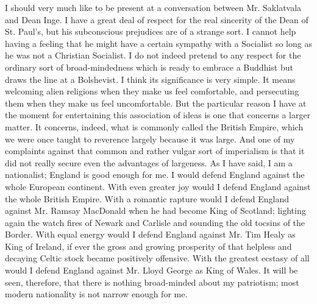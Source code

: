 \documentclass{book}
\begin{document}
I should very much like to be present at a conversation between Mr. Saklatvala and Dean Inge. I have a great deal of respect for the real sincerity of the Dean of St. Paul’s, but his subconscious prejudices are of a strange sort. I cannot help having a feeling that he might have a certain sympathy with a Socialist so long as he was not a Christian Socialist. I do not indeed pretend to any respect for the ordinary sort of broad-mindedness which is ready to embrace a Buddhist but draws the line at a Bolshevist. I think its significance is very simple. It means welcoming alien religions when they make us feel comfortable, and persecuting them when they make us feel uncomfortable. But the particular reason I have at the moment for entertaining this association of ideas is one that concerns a larger matter. It concerns, indeed, what is commonly called the British Empire, which we were once taught to reverence largely because it was large. And one of my complaints against that common and rather vulgar sort of imperialism is that it did not really secure even the advantages of largeness. As I have said, I am a nationalist; England is good enough for me. I would defend England against the whole European continent. With even greater joy would I defend England against the whole British Empire. With a romantic rapture would I defend England against Mr. Ramsay MacDonald when he had become King of Scotland; lighting again the watch fires of Newark and Carlisle and sounding the old tocsins of the Border. With equal energy would I defend England against Mr. Tim Healy as King of Ireland, if ever the gross and growing prosperity of that helpless and decaying Celtic stock became positively offensive. With the greatest ecstasy of all would I defend England against Mr. Lloyd George as King of Wales. It will be seen, therefore, that there is nothing broad-minded about my patriotism; most modern nationality is not narrow enough for me.
\end{document}
